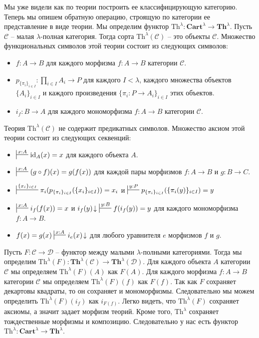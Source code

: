 \documentclass[reqno]{amsart}
\theoremstyle{definition}
\theoremstyle{remark}
\newcommand{\bcat}[1]{\mathbf{#1}}
\newcommand{\cat}[1]{\mathcal{#1}}
\newcommand{\fs}[1]{\mathrm{#1}}
\newcommand{\Th}{\bcat{Th}}
\begin{document}
Мы уже видели как по теории построить ее классифицирующую категорию.
Теперь мы опишем обратную операцию, строящую по категории ее представление в виде теории.
Мы определим функтор $\fs{Th}^\lambda : \bcat{Cart}^\lambda \to \Th^\lambda$.
Пусть $\cat{C}$ -- малая $\lambda$-полная категория.
Тогда сорта $\fs{Th}^\lambda(\cat{C})$ -- это объекты $\cat{C}$.
Множество функциональных символов этой теории состоит из следующих символов:
\begin{itemize}
\item $f : A \to B$ для каждого морфизма $f : A \to B$ категории $\cat{C}$.
\item $p_{\{ \pi_i \}_{i \in I}} : \prod_{i \in I} A_i \to P$ для каждого $I < \lambda$, каждого множества объектов $\{ A_i \}_{i \in I}$ и каждого произведения $\{ \pi_i : P \to A_i \}_{i \in I}$ этих объектов.
\item $i_f : B \to A$ для каждого мономорфизма $f : A \to B$ категории $\cat{C}$.
\end{itemize}
Теория $\fs{Th}^\lambda(\cat{C})$ не содержит предикатных символов.
Множество аксиом этой теории состоит из следующих секвенций:
\begin{itemize}
\item $\sststile{}{x : A} \fs{id}_A(x) = x$ для каждого объекта $A$.
\item $\sststile{}{x : A} (g \circ f)(x) = g(f(x))$ для каждой пары морфизмов $f : A \to B$ и $g : B \to C$.
\item $\sststile{}{\{ x_i \}_{i \in I}} \pi_i(p_{\{ \pi_i \}_{i \in I}}(\{ x_i \}_{i \in I})) = x_i$ и $\sststile{}{y : P} p_{\{ \pi_i \}_{i \in I}}(\{ \pi_i(y) \}_{i \in I}) = y$
\item $\sststile{}{x : A} i_f(f(x)) = x$ и $i_f(y)\!\downarrow\ \sststile{}{y : B} f(i_f(y)) = y$ для каждого мономорфизма $f : A \to B$.
\item $f(x) = g(x) \sststile{}{x : A} i_e(x)\!\downarrow$ для любого уравнителя $e$ морфизмов $f$ и $g$.
\end{itemize}

Пусть $F : \cat{C} \to \cat{D}$ -- функтор между малыми $\lambda$-полными категориями.
Тогда мы определим $\fs{Th}^\lambda(F) : \Th^\lambda(\cat{C}) \to \Th^\lambda(\cat{D})$.
Для каждого объекта $A$ категории $\cat{C}$ мы определяем $\fs{Th}^\lambda(F)(A)$ как $F(A)$.
Для каждого морфизма $f : A \to B$ категории $\cat{C}$ мы определяем $\fs{Th}^\lambda(F)(f)$ как $F(f)$.
Так как $F$ сохраняет декартовы квадраты, то он сохраняет и мономорфизмы.
Следовательно мы можем определить $\fs{Th}^\lambda(F)(i_f)$ как $i_{F(f)}$.
Легко видеть, что $\fs{Th}^\lambda(F)$ сохраняет аксиомы, а значит задает морфизм теорий.
Кроме того, $\fs{Th}^\lambda$ сохраняет тождественные морфизмы и композицию.
Следовательно у нас есть функтор $\fs{Th}^\lambda : \bcat{Cart}^\lambda \to \Th^\lambda$.
\end{document}

